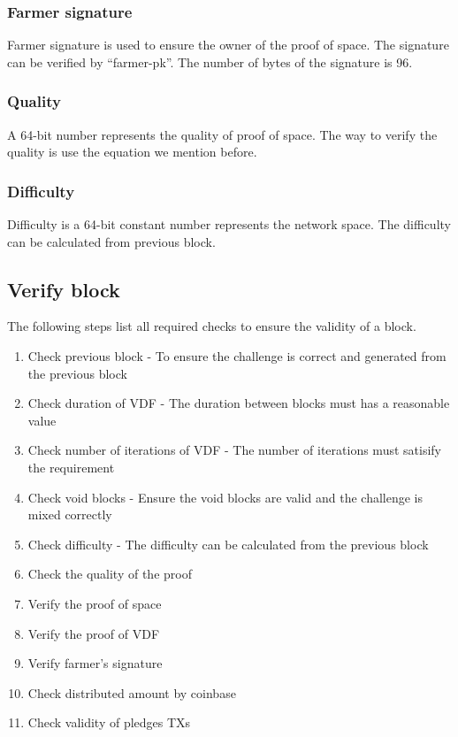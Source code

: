\subsubsection{Farmer signature}
\begin{flushleft}
    Farmer signature is used to ensure the owner of the proof of space. The signature can be verified by ``farmer-pk''. The number of bytes of the signature is 96.
\end{flushleft}
\subsubsection{Quality}
\begin{flushleft}
    A 64-bit number represents the quality of proof of space. The way to verify the quality is use the equation we mention before.
\end{flushleft}
\subsubsection{Difficulty}
\begin{flushleft}
    Difficulty is a 64-bit constant number represents the network space. The difficulty can be calculated from previous block.
\end{flushleft}
\subsection{Verify block}
\begin{flushleft}
    The following steps list all required checks to ensure the validity of a block.
\end{flushleft}
\begin{enumerate}
    \item Check previous block - To ensure the challenge is correct and generated from the previous block
    \item Check duration of VDF - The duration between blocks must has a reasonable value
    \item Check number of iterations of VDF - The number of iterations must satisify the requirement
    \item Check void blocks - Ensure the void blocks are valid and the challenge is mixed correctly
    \item Check difficulty - The difficulty can be calculated from the previous block
    \item Check the quality of the proof
    \item Verify the proof of space
    \item Verify the proof of VDF
    \item Verify farmer's signature
    \item Check distributed amount by coinbase
    \item Check validity of pledges TXs
\end{enumerate}
